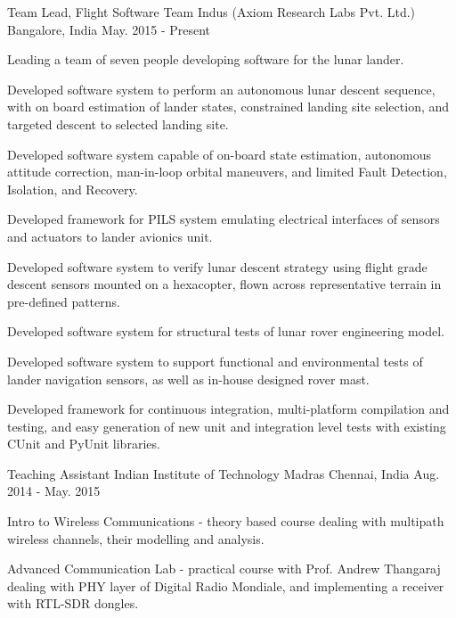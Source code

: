 \begin{cventries}
	\cventry
	{Team Lead, Flight Software}
	{Team Indus (Axiom Research Labs Pvt. Ltd.)}
	{Bangalore, India}
	{May. 2015 - Present}
	{
		\begin{cvitems}
			\item{Leading a team of seven people developing software for the lunar lander.}
			\item{Developed software system to perform an autonomous lunar descent sequence, with on board estimation of lander states, constrained landing site selection, and targeted descent to selected landing site.}
			\item{Developed software system capable of on-board state estimation, autonomous attitude correction, man-in-loop orbital maneuvers, and limited Fault Detection, Isolation, and Recovery.}
			\item{Developed framework for PILS system emulating electrical interfaces of sensors and actuators to lander avionics unit.}
			\item{Developed software system to verify lunar descent strategy using flight grade descent sensors mounted on a hexacopter, flown across representative terrain in pre-defined patterns.}
			\item{Developed software system for structural tests of lunar rover engineering model.}
			\item{Developed software system to support functional and environmental tests of lander navigation sensors, as well as in-house designed rover mast.}
			\item{Developed framework for continuous integration, multi-platform compilation and testing, and easy generation of new unit and integration level tests with existing CUnit and PyUnit libraries.}
		\end{cvitems}
	}

	\cventry
	{Teaching Assistant}
	{Indian Institute of Technology Madras}
	{Chennai, India}
	{Aug. 2014 - May. 2015}
	{
		\begin{cvitems}
			\item{Intro to Wireless Communications - theory based course dealing with multipath wireless channels, their modelling and analysis.}
			\item{Advanced Communication Lab - practical course with Prof. Andrew Thangaraj dealing with PHY layer of Digital Radio Mondiale, and implementing a receiver with RTL-SDR dongles.}
		\end{cvitems}
	}


\end{cventries}
